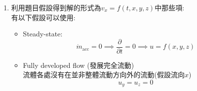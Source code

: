 \documentclass[../main.tex]{subfiles}
\begin{document}
\begin{itemize}
\begin{enumerate}
\begin{figure}[H]
\begin{tikzpicture}[>=Latex, line cap=round, line join=round, thick]
      \end{tikzpicture}
      \caption{Control Volume for Equation of continuity}
    \end{figure}
    所以質量平衡式為:
    \begin{align}
      &\rho u_x dy dz\big|_{x} - \rho u_x dy dz\big|_{x+dx} +
      \rho u_y dx dz\big|_{y} - \rho u_y dx dz\big|_{y+dy} \nonumber\\
      &\phantom{\rho u_y dx dz\big|_{y+dy}}+ \rho u_z dx dy\big|_{z} - \rho u_z dx dy\big|_{z+dz} = \frac{\partial}{\partial t}(\rho dx dy dz) \nonumber \\
      \text{同除}dxdydz\Rightarrow&
      \frac{\rho u_x|_{x} - \rho u_x|_{x+dx}}{dx} + 
      \frac{\rho u_y|_{y} - \rho u_y|_{y+dy}}{dy} +
      \frac{\rho u_z|_{z} - \rho u_z|_{z+dz}}{dz} = \frac{\partial \rho}{\partial t} \nonumber \\
      \text{同乘}-1\Rightarrow&
      -\frac{\rho u_x\big|_{x+dx} - \rho u_x\big|_{x}}{dx} -
      \frac{\rho u_y\big|_{y+dy} - \rho u_y\big|_{y}}{dy} -
      \frac{\rho u_z\big|_{z+dz} - \rho u_z\big|_{z}}{dz} = \frac{\partial \rho}{\partial t} \nonumber \\
      \Rightarrow&
      -\frac{\partial}{\partial x}(\rho u_x) -
      \frac{\partial}{\partial y}(\rho u_y) -
      \frac{\partial}{\partial z}(\rho u_z) = \frac{\partial \rho}{\partial t} \nonumber \\
      \Rightarrow&
      -\nabla \cdot (\rho \vec {\bm u}) = \frac{\partial \rho}{\partial t} \nonumber \\
      \Rightarrow&
      \frac{\partial \rho}{\partial t} + \nabla \cdot (\rho \vec {\bm u}) = 0 \label{eq:continuity_equation}
    \end{align}
    \item 利用題目假設得到解的形式為$v_x = f(t,x,y,z)$中那些項:\\
    有以下假設可以使用:
    \begin{itemize}
      \item Steady-state:
      \begin{equation}
        \dot m_{\text{acc}}=0 \implies \frac{\partial}{\partial t} = 0 \implies \boxed{u = f(x,y,z)}
      \end{equation}
      \item Fully developed flow (發展完全流動)\\
        流體各處沒有在並非整體流動方向外的流動(假設流向$x$)
        \begin{equation}
          \boxed{u_y = u_z = 0}
        \end{equation}

\end{itemize}
\end{enumerate}
\end{itemize}
\end{document}
